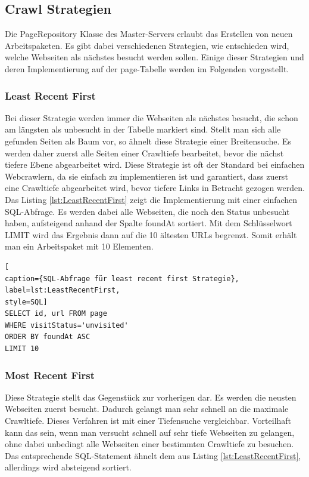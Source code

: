 \subsection{Crawl Strategien}
\label{subsec:CrawlStrategien}
Die PageRepository Klasse des Master-Servers erlaubt das Erstellen von neuen Arbeitspaketen. Es gibt dabei verschiedenen Strategien, wie entschieden wird, welche Webseiten als nächstes besucht werden sollen. Einige dieser Strategien und deren Implementierung auf der page-Tabelle werden im Folgenden vorgestellt.
\subsubsection{Least Recent First} 
Bei dieser Strategie werden immer die Webseiten als nächstes besucht, die schon am längsten als unbesucht in der Tabelle markiert sind. Stellt man sich alle gefunden Seiten als Baum vor, so ähnelt diese Strategie einer Breitensuche. Es werden daher zuerst alle Seiten einer Crawltiefe bearbeitet, bevor die nächst tiefere Ebene abgearbeitet wird. Diese Strategie ist oft der Standard bei einfachen Webcrawlern, da sie einfach zu implementieren ist und garantiert, dass zuerst eine Crawltiefe abgearbeitet wird, bevor tiefere Links in Betracht gezogen werden.\\
Das Listing \ref{lst:LeastRecentFirst} zeigt die Implementierung mit einer einfachen SQL-Abfrage. Es werden dabei alle Webseiten, die noch den Status unbesucht haben, aufsteigend anhand der Spalte foundAt sortiert. Mit dem Schlüsselwort LIMIT wird das Ergebnis dann auf die 10 ältesten URLs begrenzt. Somit erhält man ein Arbeitspaket mit 10 Elementen.\\
\begin{lstlisting}[
caption={SQL-Abfrage für least recent first Strategie},
label=lst:LeastRecentFirst,
style=SQL]
SELECT id, url FROM page
WHERE visitStatus='unvisited'
ORDER BY foundAt ASC
LIMIT 10
\end{lstlisting}

\subsubsection{Most Recent First}  
Diese Strategie stellt das Gegenstück zur vorherigen dar. Es werden die neusten Webseiten zuerst besucht. Dadurch gelangt man sehr schnell an die maximale Crawltiefe. Dieses Verfahren ist mit einer Tiefensuche vergleichbar. Vorteilhaft kann das sein, wenn man versucht schnell auf sehr tiefe Webseiten zu gelangen, ohne dabei unbedingt alle Webseiten einer bestimmten Crawltiefe zu besuchen. Das entsprechende SQL-Statement ähnelt dem aus Listing \ref{lst:LeastRecentFirst}, allerdings wird absteigend sortiert.

